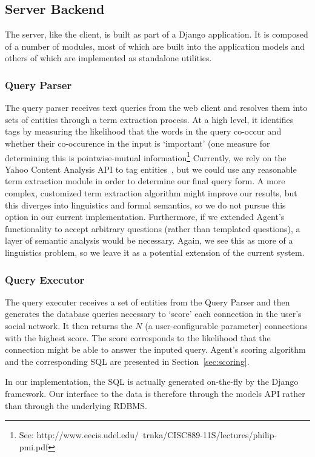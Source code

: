 \subsection{Server Backend}
The server, like the client, is built as part of a Django application. It is
composed of a number of modules, most of which are built into the application
models and others of which are implemented as standalone utilities.

\subsubsection{Query Parser}
The query parser receives text queries from the web client and resolves them
into sets of entities through a term extraction process. At a high level, it
identifies tags by measuring the likelihood that the words in the query co-occur
and whether their co-occurence in the input is `important' (one measure for
determining this is pointwise-mutual information\footnote{See:
http://www.eecis.udel.edu/~trnka/CISC889-11S/lectures/philip-pmi.pdf} Currently,
we rely on the Yahoo Content Analysis API to tag entities~\cite{yahoo_ca}, but
we could use any reasonable term extraction module in order to determine our
final query form. A more complex, customized term extraction algorithm might
improve our results, but this diverges into linguistics and formal semantics, so
we do not pursue this option in our current implementation.  Furthermore, if we
extended Agent's functionality to accept arbitrary questions (rather than
templated questions), a layer of semantic analysis would be necessary. Again, we
see this as more of a linguistics problem, so we leave it as a potential
extension of the current system.

\subsubsection{Query Executor}
The query executer receives a set of entities from the Query Parser and then
generates the database queries necessary to `score' each connection in the
user's social network.  It then returns the $N$ (a user-configurable parameter)
connections with the highest score.  The score corresponds to the likelihood
that the connection might be able to answer the inputed query. Agent's scoring
algorithm and the corresponding SQL are presented in Section~\ref{sec:scoring}.

In our implementation, the SQL is actually generated on-the-fly by the Django
framework. Our interface to the data is therefore through the models API rather
than through the underlying RDBMS.

